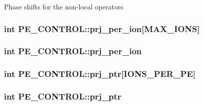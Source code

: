 Phase shifts for the non-\/local operators \hypertarget{struct_p_e___c_o_n_t_r_o_l_aa54914c5748d7f39f365722a14eb428f}{
\subsubsection[{prj\-\_\-per\-\_\-ion}]{\setlength{\rightskip}{0pt plus 5cm}int P\-E\-\_\-\-C\-O\-N\-T\-R\-O\-L\-::prj\-\_\-per\-\_\-ion\mbox{[}{\bf M\-A\-X\-\_\-\-I\-O\-N\-S}\mbox{]}}}\label{struct_p_e___c_o_n_t_r_o_l_aa54914c5748d7f39f365722a14eb428f}
\hypertarget{struct_p_e___c_o_n_t_r_o_l_a5c150c6dff819cc02449e450f67a4b58}{
\subsubsection[{prj\-\_\-per\-\_\-ion}]{\setlength{\rightskip}{0pt plus 5cm}int P\-E\-\_\-\-C\-O\-N\-T\-R\-O\-L\-::prj\-\_\-per\-\_\-ion}}\label{struct_p_e___c_o_n_t_r_o_l_a5c150c6dff819cc02449e450f67a4b58}
\hypertarget{struct_p_e___c_o_n_t_r_o_l_aa33109227fb39a8daae42cf69d706183}{
\subsubsection[{prj\-\_\-ptr}]{\setlength{\rightskip}{0pt plus 5cm}int P\-E\-\_\-\-C\-O\-N\-T\-R\-O\-L\-::prj\-\_\-ptr\mbox{[}{\bf I\-O\-N\-S\-\_\-\-P\-E\-R\-\_\-\-P\-E}\mbox{]}}}\label{struct_p_e___c_o_n_t_r_o_l_aa33109227fb39a8daae42cf69d706183}
\hypertarget{struct_p_e___c_o_n_t_r_o_l_a99cf47c831868dd9d119d3bcc360113a}{
\subsubsection[{prj\-\_\-ptr}]{\setlength{\rightskip}{0pt plus 5cm}int P\-E\-\_\-\-C\-O\-N\-T\-R\-O\-L\-::prj\-\_\-ptr}}\label{struct_p_e___c_o_n_t_r_o_l_a99cf47c831868dd9d119d3bcc360113a}
